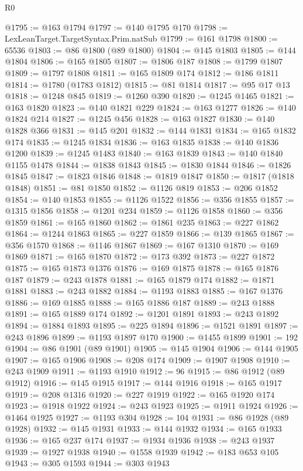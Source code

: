 \begin{lexlean}{R0}
\begin{coremodule}
@1795 := @163 @1794
@1797 := @140 @1795 @170
@1798 := LexLeanTarget.TargetSyntax.Prim.natSub
@1799 := @161 @1798
@1800 := 65536
@1803 := @86 @1800 (@89 @1800)
@1804 := @145 @1803
@1805 := @144 @1804
@1806 := @165 @1805
@1807 := @1806 @187
@1808 := @1799 @1807
@1809 := @1797 @1808
@1811 := @165 @1809 @174
@1812 := @186 @1811
@1814 := @1780 (@1783 @1812)
@1815 := @81 @1814
@1817 := @95 @17 @13
@1818 := @1248 @845
@1819 := @1260 @390
@1820 := @1245 @1465
@1821 := @163 @1820
@1823 := @140 @1821 @229
@1824 := @163 @1277
@1826 := @140 @1824 @214
@1827 := @1245 @456
@1828 := @163 @1827
@1830 := @140 @1828 @366
@1831 := @145 @201
@1832 := @144 @1831
@1834 := @165 @1832 @174
@1835 := @1245 @1834
@1836 := @163 @1835
@1838 := @140 @1836 @1200
@1839 := @1245 @1483
@1840 := @163 @1839
@1843 := @140 @1840 @1155 @1478
@1844 := @1838 @1843
@1845 := @1830 @1844
@1846 := @1826 @1845
@1847 := @1823 @1846
@1848 := @1819 @1847
@1850 := @1817 (@1818 @1848)
@1851 := @81 @1850
@1852 := @1126 @819
@1853 := @206 @1852
@1854 := @140 @1853
@1855 := @1126 @1522
@1856 := @356 @1855
@1857 := @1315 @1856
@1858 := @1201 @234
@1859 := @1126 @1858
@1860 := @356 @1859
@1861 := @165 @1860
@1862 := @1861 @235
@1863 := @227 @1862
@1864 := @1244 @1863
@1865 := @227 @1859
@1866 := @139 @1865
@1867 := @356 @1570
@1868 := @1146 @1867
@1869 := @167 @1310
@1870 := @169 @1869
@1871 := @165 @1870
@1872 := @173 @392
@1873 := @227 @1872
@1875 := @165 @1873 @1376
@1876 := @169 @1875
@1878 := @165 @1876 @187
@1879 := @243 @1878
@1881 := @165 @1879 @174
@1882 := @1871 @1881
@1883 := @243 @1882
@1884 := @1193 @1883
@1885 := @167 @1376
@1886 := @169 @1885
@1888 := @165 @1886 @187
@1889 := @243 @1888
@1891 := @165 @1889 @174
@1892 := @1201 @1891
@1893 := @243 @1892
@1894 := @1884 @1893
@1895 := @225 @1894
@1896 := @1521 @1891
@1897 := @243 @1896
@1899 := @1193 @1897 @170
@1900 := @1455 @1899
@1901 := 192
@1904 := @86 @1901 (@89 @1901)
@1905 := @145 @1904
@1906 := @144 @1905
@1907 := @165 @1906
@1908 := @208 @174
@1909 := @1907 @1908
@1910 := @243 @1909
@1911 := @1193 @1910
@1912 := 96
@1915 := @86 @1912 (@89 @1912)
@1916 := @145 @1915
@1917 := @144 @1916
@1918 := @165 @1917
@1919 := @208 @1316
@1920 := @227 @1919
@1922 := @165 @1920 @174
@1923 := @1918 @1922
@1924 := @243 @1923
@1925 := @1911 @1924
@1926 := @1464 @1925
@1927 := @1193 @304
@1928 := 104
@1931 := @86 @1928 (@89 @1928)
@1932 := @145 @1931
@1933 := @144 @1932
@1934 := @165 @1933
@1936 := @165 @237 @174
@1937 := @1934 @1936
@1938 := @243 @1937
@1939 := @1927 @1938
@1940 := @1558 @1939
@1942 := @183 @653 @105
@1943 := @305 @1593
@1944 := @303 @1943

\end{coremodule}
\end{lexlean}
